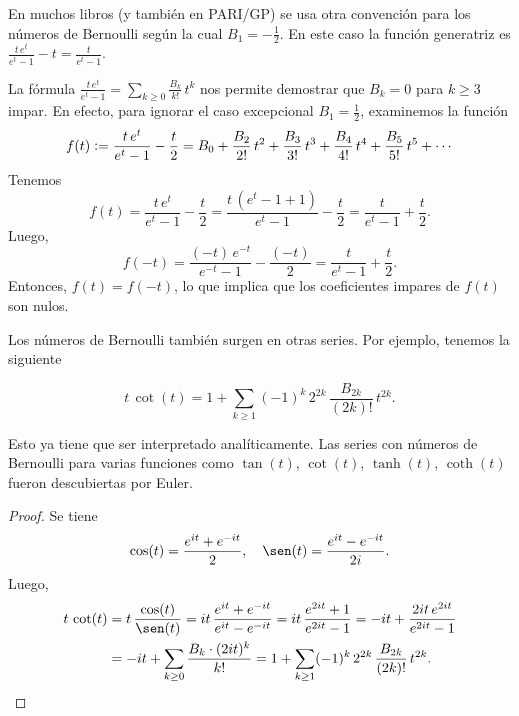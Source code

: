 \documentclass{article}
\numberwithin{equation}{section}
\theoremstyle{definition}
\begin{document}
En muchos libros (y también en PARI/GP) se usa otra convención para los números
de Bernoulli según la cual $B_1 = -\frac{1}{2}$. En este caso la función
generatriz es $\frac{t\,e^t}{e^t - 1} - t = \frac{t}{e^t - 1}$.

\begin{ejemplo}
  La fórmula $\frac{t\,e^t}{e^t - 1} = \sum_{k \ge 0} \frac{B_k}{k!}\,t^k$ nos
  permite demostrar que $B_k = 0$ para $k \ge 3$ impar. En efecto, para ignorar
  el caso excepcional $B_1 = \frac{1}{2}$, examinemos la función
  $$f (t) \mathrel{\mathop:}= \frac{t\,e^t}{e^t - 1} - \frac{t}{2} =
  B_0 + \frac{B_2}{2!}\,t^2 + \frac{B_3}{3!}\,t^3 + \frac{B_4}{4!}\,t^4 + \frac{B_5}{5!}\,t^5 + \cdots$$
  Tenemos
  $$f (t) = \frac{t\,e^t}{e^t - 1} - \frac{t}{2} =
  \frac{t\,(e^t - 1 + 1)}{e^t - 1} - \frac{t}{2} =
  \frac{t}{e^t - 1} + \frac{t}{2}.$$
  Luego,
  $$f (-t) = \frac{(-t)\,e^{-t}}{e^{-t}-1} - \frac{(-t)}{2} =
  \frac{t}{e^t - 1} + \frac{t}{2}.$$
  Entonces, $f (t) = f (-t)$, lo que implica que los coeficientes impares de
  $f (t)$ son nulos.
\end{ejemplo}

Los números de Bernoulli también surgen en otras series. Por ejemplo, tenemos la
siguiente

\begin{proposicion}
  \label{serie-para-t-cot-t}
  $$t\,\cot (t) = 1 + \sum_{k \ge 1} (-1)^k \, 2^{2k}\,\frac{B_{2k}}{(2k)!}\,t^{2k}.$$
\end{proposicion}

\noindent Esto ya tiene que ser interpretado analíticamente. Las series con
números de Bernoulli para varias funciones como $\tan (t)$, $\cot (t)$,
$\tanh (t)$, $\coth (t)$ fueron descubiertas por Euler.

\begin{proof}
  Se tiene
  $$\cos (t) = \frac{e^{it} + e^{-it}}{2}, \quad
  \sen (t) = \frac{e^{it} - e^{-it}}{2i}.$$
  Luego,
  \begin{align*}
    t\,\cot (t) & = t\,\frac{\cos (t)}{\sen (t)} =
                  it\,\frac{e^{it} + e^{-it}}{e^{it} - e^{-it}} =
                  it\,\frac{e^{2it} + 1}{e^{2it} - 1} =
                  -it + \frac{2it \, e^{2it}}{e^{2it} - 1}\\
                & = -it + \sum_{k \ge 0} \frac{B_k\cdot (2it)^k}{k!} =
                  1 + \sum_{k \ge 1} (-1)^k \, 2^{2k} \, \frac{B_{2k}}{(2k)!}\,t^{2k}.
                  \qedhere
  \end{align*}
\end{proof}
\end{document}
